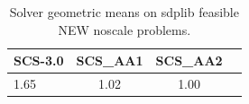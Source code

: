\begin{table}
\centering
\caption{Solver geometric means on sdplib feasible NEW noscale problems.}
\label{t-sdplib feasible NEW noscale-geom_mean}
\begin{tabular}{lccc}
\toprule
 SCS-3.0 &  SCS\_AA1 &  SCS\_AA2 \\
\midrule
    1.65 &     1.02 &     1.00 \\
\bottomrule
\end{tabular}
\end{table}
